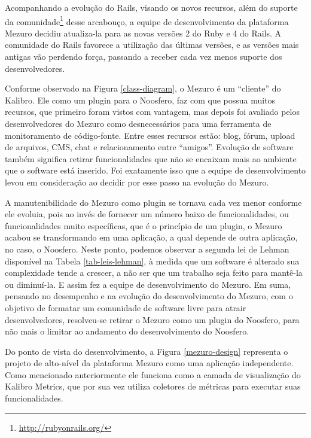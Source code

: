 Acompanhando a evolução do Rails, visando os novos recursos, além do suporte da comunidade\footnote{\url{http://rubyonrails.org/}} desse arcabouço, a equipe de desenvolvimento da plataforma Mezuro decidiu atualiza-la para as novas versões 2 do Ruby e 4 do Rails. A comunidade do Rails favorece a utilização das últimas versões, e as versões mais antigas vão perdendo força, passando a receber cada vez menos suporte dos desenvolvedores.

Conforme observado na Figura \ref{class-diagram}, o Mezuro é um ``cliente'' do Kalibro. Ele como um plugin para o Noosfero, faz com que possua muitos recursos, que primeiro foram vistos com vantagem, mas depois foi avaliado pelos desenvolvedores do Mezuro como desnecessários para uma ferramenta de monitoramento de código-fonte. Entre esses recursos estão: blog, fórum, upload de arquivos, CMS, chat e relacionamento entre  ``amigos''. Evolução de software também significa retirar funcionalidades que não se encaixam mais ao ambiente que o software está inserido. Foi exatamente isso que a equipe de desenvolvimento levou em consideração ao decidir por esse passo na evolução do Mezuro.

A manutenibilidade do Mezuro como plugin se tornava cada vez menor conforme ele evoluia, pois ao invés de fornecer um número baixo de funcionalidades, ou funcionalidades muito específicas, que é o princípio de um plugin, o Mezuro acabou se transformando em uma aplicação, a qual depende de outra aplicação, no caso, o Noosfero. Neste ponto, podemos observar a segunda lei de Lehman disponível na Tabela \ref{tab-leis-lehman}, à medida que um software é alterado sua complexidade tende a crescer, a não ser que um trabalho seja feito para mantê-la ou diminuí-la. E assim fez a equipe de desenvolvimento do Mezuro.
%
Em suma, pensando no desempenho e na evolução do desenvolvimento do Mezuro, com o objetivo de formatar um comunidade de software livre para atrair desenvolvedores, resolveu-se retirar o Mezuro como um plugin do Noosfero, para não mais o limitar ao andamento do desenvolvimento do Noosfero. 

Do ponto de vista do desenvolvimento, a Figura \ref{mezuro-design} representa o projeto de alto-nível da plataforma Mezuro como uma aplicação independente. Como mencionado anteriormente ele funciona como a camada de visualização do Kalibro Metrics, que por sua vez utiliza coletores de métricas para executar suas funcionalidades.

